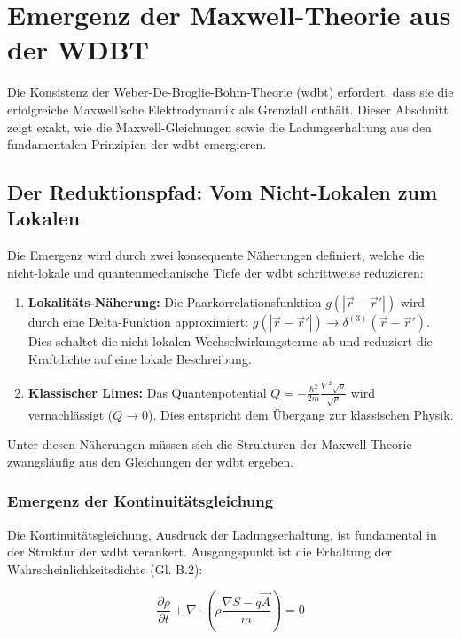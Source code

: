 \chapter{Emergenz der Maxwell-Theorie aus der WDBT}
\label{sec:emergence-maxwell}

Die Konsistenz der Weber-De-Broglie-Bohm-Theorie (\gls{wdbt}) erfordert, dass sie die erfolgreiche Maxwell'sche Elektrodynamik als Grenzfall enthält. Dieser Abschnitt zeigt exakt, wie
die Maxwell-Gleichungen sowie die Ladungserhaltung aus den fundamentalen Prinzipien der \gls{wdbt} emergieren.

\section{Der Reduktionspfad: Vom Nicht-Lokalen zum Lokalen}

Die Emergenz wird durch zwei konsequente Näherungen definiert, welche die nicht-lokale und quantenmechanische Tiefe der \gls{wdbt} schrittweise reduzieren:

\begin{enumerate}
    \item \textbf{Lokalitäts-Näherung:} Die Paarkorrelationsfunktion $g(|\vec{r} - \vec{r}'|)$ wird durch eine Delta-Funktion approximiert: $g(|\vec{r} - \vec{r}'|) \rightarrow \delta^{(3)}(\vec{r} - \vec{r}')$. Dies schaltet die nicht-lokalen Wechselwirkungsterme ab und reduziert die Kraftdichte auf eine lokale Beschreibung.
    \item \textbf{Klassischer Limes:} Das Quantenpotential $Q = -\frac{\hbar^2}{2m} \frac{\nabla^2 \sqrt{\rho}}{\sqrt{\rho}}$ wird vernachlässigt ($Q \rightarrow 0$). Dies entspricht dem Übergang zur klassischen Physik.
\end{enumerate}

Unter diesen Näherungen müssen sich die Strukturen der Maxwell-Theorie zwangsläufig aus den Gleichungen der \gls{wdbt} ergeben.

\subsection{Emergenz der Kontinuitätsgleichung}

Die Kontinuitätsgleichung, Ausdruck der Ladungserhaltung, ist fundamental in der Struktur der \gls{wdbt} verankert. Ausgangspunkt ist die Erhaltung der Wahrscheinlichkeitsdichte (Gl. B.2):

\begin{equation}
    \frac{\partial \rho}{\partial t} + \nabla \cdot \left( \rho \frac{\nabla S - q\vec{A}}{m} \right) = 0
\end{equation}

